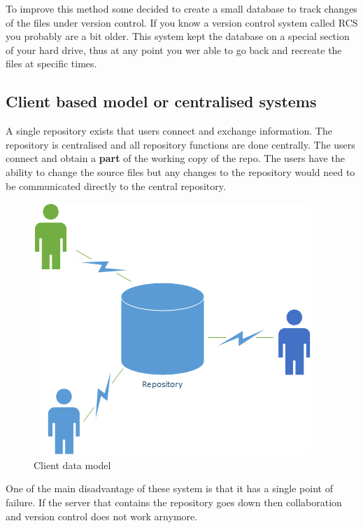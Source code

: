 \documentclass[
]{book}
\theoremstyle{definition}
\theoremstyle{definition}
\theoremstyle{definition}
\theoremstyle{remark}
\begin{document}
To improve this method some decided to create a small database to track changes of the files under version control.
If you know a version control system called RCS you probably are a bit older. This system kept the database on a special section of your hard drive, thus at any point you wer able to go back and recreate the files at specific times.

\hypertarget{client-based-model-or-centralised-systems}{%
\subsection*{Client based model or centralised systems}\label{client-based-model-or-centralised-systems}}

A single repository exists that users connect and exchange information. The repository is centralised and all repository functions are done centrally. The users connect and obtain a \textbf{part} of the working copy of the repo. The users have the ability to change the source files but any changes to the repository would need to be communicated directly to the central repository.

\begin{figure}

{\centering \includegraphics[width=0.6\linewidth]{images/Client Data Model Example} 

}

\caption{Client data model}\label{fig:unnamed-chunk-2}
\end{figure}

One of the main disadvantage of these system is that it has a single point of failure. If the server that contains the repository goes down then collaboration and version control does not work arnymore.
\end{document}
